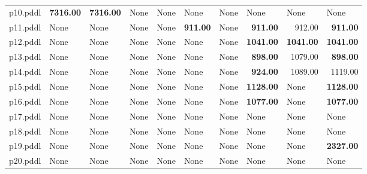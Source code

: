 \documentclass{article}
\begin{document}
\begin{tabular}{@{}lrrrrrrrrr@{}}
p10.pddl & \textbf{7316.00} & \textbf{7316.00} & \multicolumn{1}{|l|}{None} & \multicolumn{1}{|l|}{None} & \multicolumn{1}{|l|}{None} & \multicolumn{1}{|l|}{None} & \multicolumn{1}{|l|}{None} & \multicolumn{1}{|l|}{None} & \multicolumn{1}{|l|}{None} \\
p11.pddl & \multicolumn{1}{|l|}{None} & \multicolumn{1}{|l|}{None} & \multicolumn{1}{|l|}{None} & \multicolumn{1}{|l|}{None} & \textbf{911.00} & \multicolumn{1}{|l|}{None} & \textbf{911.00} & 912.00 & \textbf{911.00} \\
p12.pddl & \multicolumn{1}{|l|}{None} & \multicolumn{1}{|l|}{None} & \multicolumn{1}{|l|}{None} & \multicolumn{1}{|l|}{None} & \multicolumn{1}{|l|}{None} & \multicolumn{1}{|l|}{None} & \textbf{1041.00} & \textbf{1041.00} & \textbf{1041.00} \\
p13.pddl & \multicolumn{1}{|l|}{None} & \multicolumn{1}{|l|}{None} & \multicolumn{1}{|l|}{None} & \multicolumn{1}{|l|}{None} & \multicolumn{1}{|l|}{None} & \multicolumn{1}{|l|}{None} & \textbf{898.00} & 1079.00 & \textbf{898.00} \\
p14.pddl & \multicolumn{1}{|l|}{None} & \multicolumn{1}{|l|}{None} & \multicolumn{1}{|l|}{None} & \multicolumn{1}{|l|}{None} & \multicolumn{1}{|l|}{None} & \multicolumn{1}{|l|}{None} & \textbf{924.00} & 1089.00 & 1119.00 \\
p15.pddl & \multicolumn{1}{|l|}{None} & \multicolumn{1}{|l|}{None} & \multicolumn{1}{|l|}{None} & \multicolumn{1}{|l|}{None} & \multicolumn{1}{|l|}{None} & \multicolumn{1}{|l|}{None} & \textbf{1128.00} & \multicolumn{1}{|l|}{None} & \textbf{1128.00} \\
p16.pddl & \multicolumn{1}{|l|}{None} & \multicolumn{1}{|l|}{None} & \multicolumn{1}{|l|}{None} & \multicolumn{1}{|l|}{None} & \multicolumn{1}{|l|}{None} & \multicolumn{1}{|l|}{None} & \textbf{1077.00} & \multicolumn{1}{|l|}{None} & \textbf{1077.00} \\
p17.pddl & \multicolumn{1}{|l|}{None} & \multicolumn{1}{|l|}{None} & \multicolumn{1}{|l|}{None} & \multicolumn{1}{|l|}{None} & \multicolumn{1}{|l|}{None} & \multicolumn{1}{|l|}{None} & \multicolumn{1}{|l|}{None} & \multicolumn{1}{|l|}{None} & \multicolumn{1}{|l|}{None} \\
p18.pddl & \multicolumn{1}{|l|}{None} & \multicolumn{1}{|l|}{None} & \multicolumn{1}{|l|}{None} & \multicolumn{1}{|l|}{None} & \multicolumn{1}{|l|}{None} & \multicolumn{1}{|l|}{None} & \multicolumn{1}{|l|}{None} & \multicolumn{1}{|l|}{None} & \multicolumn{1}{|l|}{None} \\
p19.pddl & \multicolumn{1}{|l|}{None} & \multicolumn{1}{|l|}{None} & \multicolumn{1}{|l|}{None} & \multicolumn{1}{|l|}{None} & \multicolumn{1}{|l|}{None} & \multicolumn{1}{|l|}{None} & \multicolumn{1}{|l|}{None} & \multicolumn{1}{|l|}{None} & \textbf{2327.00} \\
p20.pddl & \multicolumn{1}{|l|}{None} & \multicolumn{1}{|l|}{None} & \multicolumn{1}{|l|}{None} & \multicolumn{1}{|l|}{None} & \multicolumn{1}{|l|}{None} & \multicolumn{1}{|l|}{None} & \multicolumn{1}{|l|}{None} & \multicolumn{1}{|l|}{None} & \multicolumn{1}{|l|}{None} \\
\end{tabular}
\end{document}
